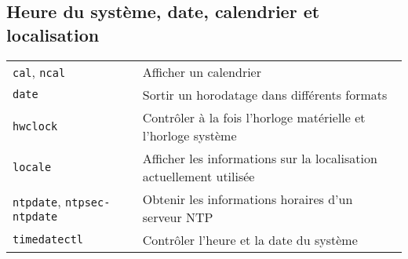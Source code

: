 \documentclass[10pt,a4paper]{article}
\begin{document}
\begin{multicols}{2}

\section{Heure du système, date, calendrier et localisation}
\begin{tabular}{ p{2.75cm} p{8.25cm} }
  \hline
  \texttt{cal}, \texttt{ncal} & Afficher un calendrier\\
  \rowcolor{Gray}
  \texttt{date} & Sortir un horodatage dans différents formats \\
  \texttt{hwclock} & Contrôler à la fois l'horloge matérielle et l'horloge système\\
  \rowcolor{Gray}
  \texttt{locale} & Afficher les informations sur la localisation actuellement utilisée \\
  \texttt{ntpdate}, \texttt{ntpsec-ntpdate} & Obtenir les informations horaires d'un serveur NTP \\
  \rowcolor{Gray}
  \texttt{timedatectl} & Contrôler l'heure et la date du système \\
  \hline
\end{tabular}



\end{multicols}
\end{document}
